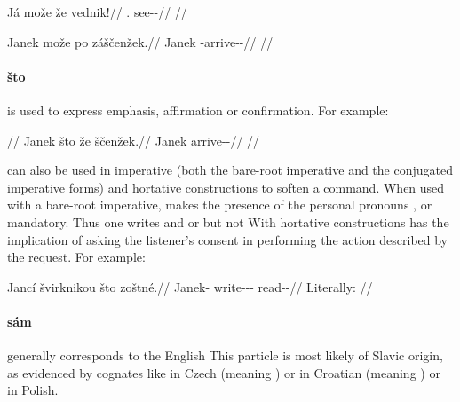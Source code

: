 \pex
\begingl
	\gla Já može že vednik!//
	\glb \Second{}.\Sg{} \Add{} \Ipfv{} see-\Pv{}-\Pf{}//
	\glft {}//
\endgl
\xe

\pex
\begingl
	\gla Janek može po záščenžek.//
	\glb Janek \Add{} \Ipfv{} \Neg{}-arrive-\Av{}-\Pf{}//
	\glft {}//
\endgl
\xe


\paragraph{što}  is used to express emphasis, affirmation or
confirmation. For example:

\pex
\begingl
	\glpreamble {}//
	\gla Janek što že ščenžek.//
	\glb Janek \Aff{} \Pfv{} arrive-\Av{}-\Pf{}//
	\glft {}//
\endgl
\xe

 can also be used in imperative (both the bare-root imperative and the
conjugated imperative forms) and hortative constructions to soften a command.
When used with a bare-root imperative,  makes the presence of the
personal pronouns ,  or
 mandatory. Thus one writes   and   or  but not  With hortative constructions  has the implication of asking the
listener's consent in performing the action described by the request. For
example:

\pex
\begingl
	\gla Jancí švirknikou što zoštné.//
	\glb Janek-\Gen{} write-\Pv{}-\Pf{}-\Nz{} \Aff{} read-\Pv{}-\Hort{}//
	\glft {} Literally: //
\endgl
\xe

\paragraph{sám}  generally corresponds to the English 
This particle is most likely of Slavic origin, as evidenced by cognates like
 in Czech (meaning ) or in Croatian (meaning
) or  in Polish.

